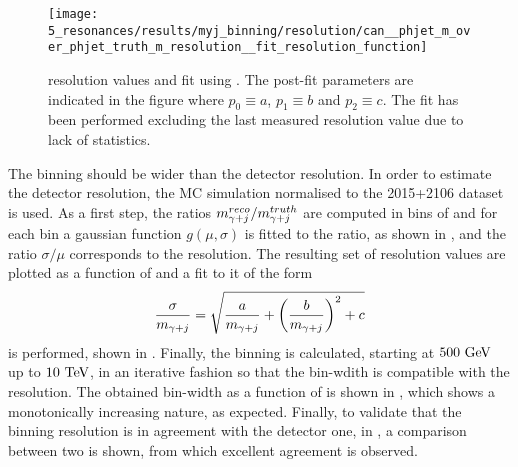 \begin{figure}[ht!]
    \centering
    \texttt{[image: 5\_resonances/results/myj\_binning/resolution/can\_\_phjet\_m\_over\_phjet\_truth\_m\_resolution\_\_fit\_resolution\_function]}
    \caption{\myj resolution values and fit using \Eqn{\ref{eq:results:obs:binning_resolution}}. The post-fit parameters are indicated in the figure where \(p_0 \equiv a\), \(p_1 \equiv b\) and \(p_2 \equiv c\). The fit has been performed excluding the last measured resolution value due to lack of statistics.}
    \label{fig:results:obs:resolution_curve}
\end{figure}

The binning should be wider than the detector resolution. In order to estimate the detector resolution, the \pythia \gammajet \ac{MC} simulation normalised to the 2015+2106 dataset is used. As a first step, the ratios \(m_{\gamma+j}^{reco} / m_{\gamma+j}^{truth}\) are computed in bins of \myj and for each bin a gaussian function \(g(\mu, \sigma)\) is fitted to the ratio, as shown in \Fig{\ref{fig:results:obs:ratio_fits}}, and the ratio \(\sigma / \mu\) corresponds to the resolution. The resulting set of resolution values are plotted as a function of \myj and a fit to it of the form
\begin{equation}
    \label{eq:results:obs:binning_resolution}
    \frac{\sigma}{m_{\gamma+j}} = \sqrt{
        \frac{a}{m_{\gamma+j}} +
        \left(\frac{b}{m_{\gamma+j}}\right)^2 +
        c
    }
\end{equation}
is performed, shown in \Fig{\ref{fig:results:obs:resolution_curve}}. Finally, the \myj binning is calculated, starting at \(500~\text{GeV}\) up to \(10~\text{TeV}\), in an iterative fashion so that the bin-wdith is compatible with the resolution. The obtained bin-width as a function of \myj is shown in \Fig{\ref{fig:bkg_modeling:observable:results:binwidth}}, which shows a monotonically increasing nature, as expected. Finally, to validate that the binning resolution is in agreement with the detector one, in \Fig{\ref{fig:bkg_modeling:observable:results:resolution_comparison}}, a comparison between two is shown, from which excellent agreement is observed.

